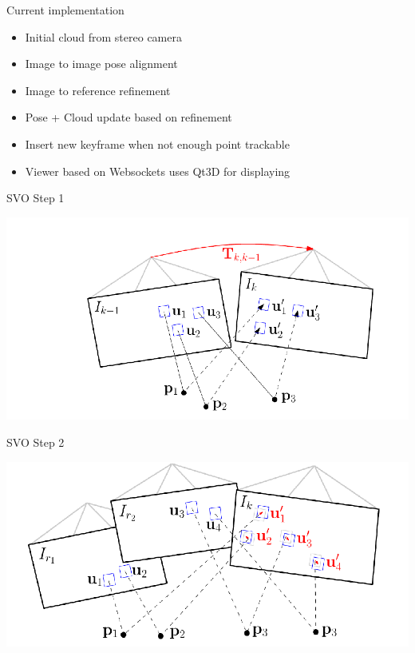 \documentclass[aspectratio=169]{beamer}
\begin{document}
\begin{frame}{Current implementation}
\begin{itemize}
  \item Initial cloud from stereo camera
  \item Image to image pose alignment
  \item Image to reference refinement
  \item Pose + Cloud update based on refinement
  \item Insert new keyframe when not enough point trackable
  \item Viewer based on Websockets uses Qt3D for displaying
\end{itemize}
\end{frame}

\begin{frame}{SVO Step 1}
  \begin{center}
    \includegraphics[height=0.9\textheight]{./img/svo_step1.png}
  \end{center}
\end{frame}

\begin{frame}{SVO Step 2}
  \begin{center}
    \includegraphics[height=0.9\textheight]{./img/svo_step2.png}
  \end{center}
\end{frame}
\end{document}
